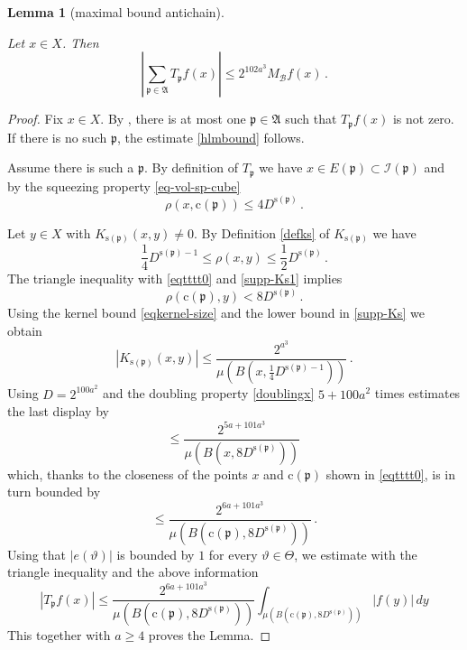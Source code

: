 \documentclass[10pt,a4paper]{article}
\theoremstyle{plain}
\newtheorem{lemma}[theorem]{Lemma}
\theoremstyle{definition}
\numberwithin{equation}{subsection}
\newcommand{\fp}{{\mathfrak p}}
\newcommand{\pc}{{\mathrm{c}}}
\newcommand{\ps}{{\mathrm{s}}}
\newcommand{\scI}{{\mathcal{I}}} %
\newcommand{\mfa}{{\vartheta}}
\newcommand{\Mf}{{\Theta}}
\newcommand{\lean}[1]{}
\newcommand{\uses}[1]{}
\newcommand{\leanok}{}
\begin{document}
\begin{lemma}[maximal bound antichain]
    \label{maximal-bound-antichain}
    \uses{tile-disjointness}
    \leanok
    \lean{maximal_bound_antichain}
    Let $x\in X$.
    Then
    \begin{equation}\label{hlmbound}
    | \sum_{\fp \in \mathfrak{A}}T_{\fp} f(x)|\le 2^{102 a^3} M_{\mathcal{B}} f (x) \, .
    \end{equation}
\end{lemma}

\begin{proof}
\leanok
Fix $x\in X$. By , there is at most one $\fp \in \mathfrak{A}$
such that
 $T_{\fp} f(x)$ is not zero.
 If there is no such $\fp$, the estimate \eqref{hlmbound} follows.

 Assume there is such a $\fp$.
 By definition of $T_{\fp}$ we have $x\in E(\fp)\subset \scI(\fp)$ and by the squeezing property \eqref{eq-vol-sp-cube}
\begin{equation}\label{eqtttt0}
    \rho(x, \pc(\fp))\le 4D^{\ps(\fp)}\, .
\end{equation}

Let $y\in X$ with $K_{\ps(\fp)}(x,y)\neq 0$. By Definition \eqref{defks} of $K_{\ps(\fp)}$
we have
\begin{equation}\label{supp-Ks1}
   \frac{1}{4} D^{\ps(\fp)-1}
   \leq \rho(x,y) \leq \frac{1}{2} D^{\ps(\fp)}\, .
\end{equation}
The triangle inequality with \eqref{eqtttt0} and \eqref{supp-Ks1} implies
\begin{equation}
    \rho(\pc(\fp),y) < 8D^{\ps(\fp)}\, .
\end{equation}
Using the kernel bound \eqref{eqkernel-size} and the lower bound in \eqref{supp-Ks}
we obtain
\begin{equation}
|K_{\ps(\fp)}(x,y)|\le \frac{2^{a^3}}{\mu(B(x,\frac 14 D^{{\ps(\fp)}-1}))}\, .
\end{equation}
Using $D=2^{100a^2}$
and the doubling property \eqref{doublingx} $5 +100a^2$ times estimates
the last display by
\begin{equation}
\le \frac{2^{5a+101a^3}}{\mu(B(x, 8D^{\ps(\fp)}))}\,
\end{equation}
which, thanks to the closeness of the points $x$ and $\pc(\fp)$ shown in \eqref{eqtttt0}, is in turn bounded by
\begin{equation}
\le \frac{2^{6a+101a^3}}{\mu(B(\pc(\fp), 8D^{\ps(\fp)}))}\, .
\end{equation}
 Using that {$|e(\mfa)|$} is bounded by $1$
for every $\mfa\in \Mf$, we estimate with the triangle inequality and the above information
 \begin{equation}
  | T_{\fp} f(x)|
    \le \frac{2^{6a+101 a^3}}{\mu(B(\pc(\fp), 8D^{\ps(\fp)}))} \int _{\mu(B(\pc(\fp), 8D^{\ps(\fp)}))} |f(y)|\, dy
  \end{equation}
This together with $a\ge 4$ proves the Lemma.
\end{proof}
\end{document}
